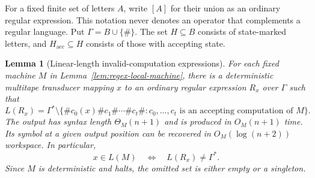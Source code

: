 \documentclass[11pt]{article}
\newtheorem{lemma}[theorem]{Lemma}
\theoremstyle{definition}
\theoremstyle{remark}
\begin{document}
For a fixed finite set of letters $A$, write $[A]$ for their union as an
ordinary regular expression. This notation never denotes an operator
that complements a regular language. Put $\Gamma=B\cup\{\#\}$.
The set $H\subseteq B$ consists of state-marked letters, and
$H_{\mathrm{acc}}\subseteq H$ consists of those with accepting state.

\begin{lemma}[Linear-length invalid-computation expressions]
\label{lem:linear-regex-reduction}
For each fixed machine $M$ in Lemma~\ref{lem:regex-local-machine}, there
is a deterministic multitape transducer mapping $x$ to an ordinary
regular expression $R_x$ over $\Gamma$ such that
\[
 L(R_x)=\Gamma^*\setminus
 \{\#c_0(x)\#c_1\#\cdots\#c_t\#:
          c_0,\ldots,c_t\text{ is an accepting computation of }M\}.
\]
The output has syntax length $\Theta_M(n+1)$ and is produced in
$O_M(n+1)$ time. Its symbol at a given output position can be recovered
in $O_M(\log(n+2))$ workspace. In particular,
\[
 x\in L(M)\quad\Longleftrightarrow\quad L(R_x)\ne\Gamma^*.
\]
Since $M$ is deterministic and halts, the omitted set is either empty
or a singleton.
\end{lemma}
\end{document}
